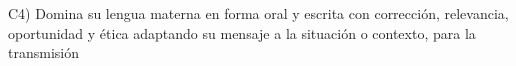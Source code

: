 C4) Domina su lengua materna en forma oral y escrita con correcci\'{o}n,
relevancia, oportunidad y \'{e}tica adaptando su mensaje a la situaci\'{o}n o
contexto, para la transmisi\'{o}n
